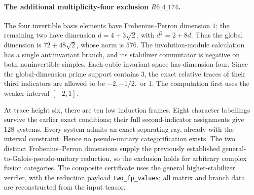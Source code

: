 \paragraph{The additional multiplicity-four exclusion $R6\_4\_174$.}
The four invertible basis elements have Frobenius--Perron dimension $1$;
the remaining two have dimension $d=4+3\sqrt2$, with $d^2=2+8d$.
Thus the global dimension is $72+48\sqrt2$, whose norm is $576$.
The involution-module calculation has a single antiinvariant branch, and
its stabilizer commutator is negative on both noninvertible simples.
Each cubic invariant space has dimension four. Since the global-dimension
prime support contains $3$, the exact relative traces of their third
indicators are allowed to be $-2,-1/2,$ or $1$. The computation first uses
the weaker interval $[-2,1]$.

At trace height six, there are ten low induction frames. Eight character
labellings survive the earlier exact conditions; their full second-indicator
assignments give 128 systems. Every system admits an exact separating ray,
already with the interval constraint. Hence no pseudo-unitary
categorification exists. The two distinct Frobenius--Perron dimensions
supply the previously established general-to-Galois-pseudo-unitary reduction,
so the exclusion holds for arbitrary complex fusion categories.
The composite certificate uses the general higher-stabilizer verifier,
with the reduction payload \texttt{two\_fp\_values}; all matrix and branch
data are reconstructed from the input tensor.
